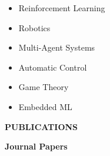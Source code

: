 \documentclass[12pt]{article}
\begin{document}
\begin{multicols}{3}
	\begin{itemize}\itemsep -2pt
		\item Reinforcement Learning
		\item Robotics
		\item Multi-Agent Systems
		\item Automatic Control
		\item Game Theory
		\item Embedded ML
	\end{itemize}
\end{multicols}




\begin{center}
	{\noindent \bfseries PUBLICATIONS}
\end{center}



\noindent
{\bfseries Journal Papers}
\end{document}

